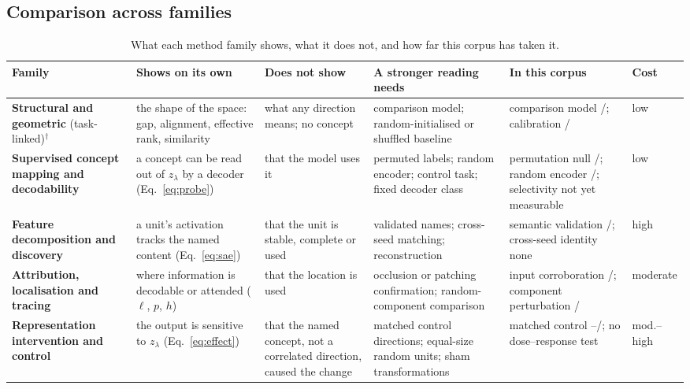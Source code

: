 \subsection{Comparison across families}
\label{sec:comparison}

\begin{table}[!tb]
\centering\footnotesize\setlength\tabcolsep{3pt}\renewcommand{\arraystretch}{1.12}
\caption{What each method family shows, what it does not, and how far this corpus has taken it.}
\label{tab:families}
\begin{tabular}{@{}L{2.2cm}L{3.0cm}L{2.5cm}L{3.0cm}L{3.1cm}L{1.4cm}@{}}
\toprule
Family & Shows on its own & Does not show & A stronger reading needs & In this corpus & Cost \\
\midrule
\textbf{Structural and geometric} (task-linked)$^{\dagger}$ & the shape of the space: gap, alignment, effective rank, similarity & what any direction means; no concept & comparison model; random-initialised or shuffled baseline & comparison model \Vcomp{}/\Vcompn{}; calibration \Vncalgeo{}/\Vncalgeon{} & low \\
\addlinespace[3pt]
\textbf{Supervised concept mapping and decodability} & a concept can be read out of $z_\lambda$ by a decoder (Eq.~\ref{eq:probe}) & that the model uses it & permuted labels; random encoder; control task; fixed decoder class & permutation null \Vpermdec{}/\Vpermdecn{}; random encoder \Vlrndec{}/\Vlrndecn{}; selectivity not yet measurable & low \\
\addlinespace[3pt]
\textbf{Feature decomposition and discovery} & a unit's activation tracks the named content (Eq.~\ref{eq:sae}) & that the unit is stable, complete or used & validated names; cross-seed matching; reconstruction & semantic validation \Vsem{}/\Vsemn{}; cross-seed identity none & high \\
\addlinespace[3pt]
\textbf{Attribution, localisation and tracing} & where information is decodable or attended ($\ell$, $p$, $h$) & that the location is used & occlusion or patching confirmation; random-component comparison & input corroboration \Vinp{}/\Vinpn{}; component perturbation \Vinttr{}/\Vinttrn{} & moderate \\
\addlinespace[3pt]
\textbf{Representation intervention and control} & the output is sensitive to $z_\lambda$ (Eq.~\ref{eq:effect}) & that the named concept, not a correlated direction, caused the change & matched control directions; equal-size random units; sham transformations & matched control \Vspca{}--\Vspc{}/\Vspcn{}; no dose--response test & mod.--high \\

\end{tabular}
\end{table}
